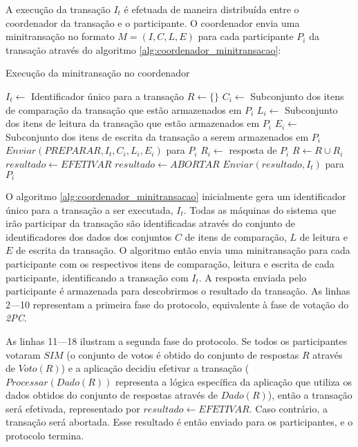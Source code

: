 \documentclass[11pt,twoside,a4paper]{book}
\begin{document}
A execução da transação \(I_t\) é efetuada de maneira distribuída entre o coordenador da transação e o participante. O coordenador envia uma minitransação no formato \(M = (I, C, L, E)\) para cada participante \(P_i\) da transação através do algoritmo \ref{alg:coordenador_minitransacao}:
\begin{algorithm}
\caption{Execução da minitransação no coordenador}
\label{alg:coordenador_minitransacao}
\begin{algorithmic}[1]
\State $I_t \gets$ Identificador único para a transação
\State $R \gets \{\}$
	\State $C_i \gets$ Subconjunto dos itens de comparação da transação que estão armazenados em $P_i$
	\State $L_i \gets$ Subconjunto dos itens de leitura da transação que estão armazenados em $P_i$
	\State $E_i \gets$ Subconjunto dos itens de escrita da transação a serem armazenados em $P_i$
	\State $Enviar(PREPARAR, I_t, C_i, L_i, E_i)$ para $P_i$
	\State $R_i \gets$ resposta de $P_i$
	\State $R \gets R \cup R_i$
\EndFor
{}
	\State $resultado \gets EFETIVAR$
\Else
	\State $resultado \gets ABORTAR$
\EndIf
{}
	\State $Enviar(resultado, I_t)$ para $P_i$
\EndFor
\end{algorithmic}
\end{algorithm}

O algoritmo \ref{alg:coordenador_minitransacao} inicialmente gera um identificador único para a transação a ser executada, $I_t$. Todas as máquinas do sistema que irão participar da transação são identificadas através do conjunto de identificadores dos dados dos conjuntos $C$ de itens de comparação, $L$ de leitura e $E$ de escrita da transação. O algoritmo então envia uma minitransação para cada participante com os respectivos itens de comparação, leitura e escrita de cada participante, identificando a transação com $I_t$. A resposta enviada pelo participante é armazenada para descobrirmos o resultado da transação. As linhas 2---10 representam a primeira fase do protocolo, equivalente à fase de votação do \emph{2PC}.

As linhas 11---18 ilustram a segunda fase do protocolo. Se todos os participantes votaram $SIM$ (o conjunto de votos é obtido do conjunto de respostas $R$ através de $Voto(R)$) e a aplicação decidiu efetivar a transação ($Processar(Dado(R))$ representa a lógica específica da aplicação que utiliza os dados obtidos do conjunto de respostas através de $Dado(R)$), então a transação será efetivada, representado por $resultado \gets EFETIVAR$. Caso contrário, a transação será abortada. Esse resultado é então enviado para os participantes, e o protocolo termina.
\end{document}
